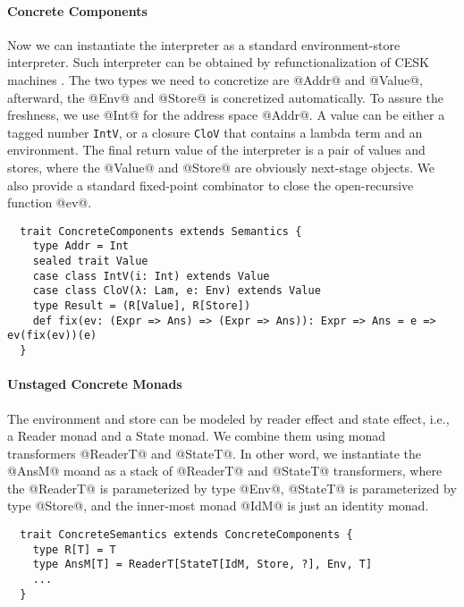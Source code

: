 \paragraph{Concrete Components}
Now we can instantiate the interpreter as a standard environment-store
interpreter. Such interpreter can be obtained by refunctionalization of CESK
machines \cite{Felleisen:1987:CAH:41625.41654, DBLP:conf/ppdp/AgerBDM03}.
The two types we need to concretize are @Addr@ and @Value@, afterward, the @Env@
and @Store@ is concretized automatically. To assure the freshness, we use @Int@
for the address space @Addr@. A value can be either a tagged number
\texttt{IntV}, or a closure \texttt{CloV} that contains a lambda term and an
environment. The final return value of the interpreter is a pair of values and
stores, where the @Value@ and @Store@ are obviously next-stage objects. We also
provide a standard fixed-point combinator to close the open-recursive function @ev@.

\begin{lstlisting}
  trait ConcreteComponents extends Semantics {
    type Addr = Int
    sealed trait Value
    case class IntV(i: Int) extends Value
    case class CloV(λ: Lam, e: Env) extends Value
    type Result = (R[Value], R[Store])
    def fix(ev: (Expr => Ans) => (Expr => Ans)): Expr => Ans = e => ev(fix(ev))(e)
  }
\end{lstlisting}

\paragraph{Unstaged Concrete Monads}
The environment and store can be modeled by reader effect and state effect,
i.e., a Reader monad and a State monad. We combine them using monad transformers
@ReaderT@ and @StateT@.
In other word, we instantiate the @AnsM@ moand as a stack of @ReaderT@ and @StateT@
transformers, where the @ReaderT@ is parameterized by type @Env@, @StateT@ is
parameterized by type @Store@, and the inner-most monad @IdM@ is just an identity
monad.

\begin{lstlisting}
  trait ConcreteSemantics extends ConcreteComponents {
    type R[T] = T
    type AnsM[T] = ReaderT[StateT[IdM, Store, ?], Env, T]
    ...
  }
\end{lstlisting}

